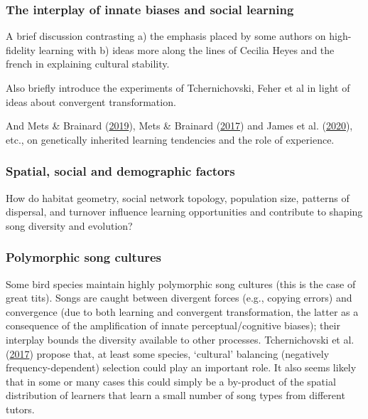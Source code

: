 \documentclass[]{report}
\begin{document}
\hypertarget{the-interplay-of-innate-biases-and-social-learning}{%
\subsubsection{The interplay of innate biases and social
learning}\label{the-interplay-of-innate-biases-and-social-learning}}

A brief discussion contrasting a) the emphasis placed by some authors on
high-fidelity learning with b) ideas more along the lines of Cecilia
Heyes and the french in explaining cultural stability.

Also briefly introduce the experiments of Tchernichovski, Feher et al in
light of ideas about convergent transformation.

And Mets \& Brainard (\protect\hyperlink{ref-Mets2019}{2019}), Mets \&
Brainard (\protect\hyperlink{ref-Mets2017}{2017}) and James et al.
(\protect\hyperlink{ref-James2020}{2020}), etc., on genetically
inherited learning tendencies and the role of experience.

\hypertarget{spatial-social-and-demographic-factors}{%
\subsubsection{Spatial, social and demographic
factors}\label{spatial-social-and-demographic-factors}}

How do habitat geometry, social network topology, population size,
patterns of dispersal, and turnover influence learning opportunities and
contribute to shaping song diversity and evolution?

\hypertarget{polymorphic-song-cultures}{%
\subsubsection{Polymorphic song
cultures}\label{polymorphic-song-cultures}}

Some bird species maintain highly polymorphic song cultures (this is the
case of great tits). Songs are caught between divergent forces (e.g.,
copying errors) and convergence (due to both learning and convergent
transformation, the latter as a consequence of the amplification of
innate perceptual/cognitive biases); their interplay bounds the
diversity available to other processes. Tchernichovski et al.
(\protect\hyperlink{ref-Tchernichovski2017a}{2017}) propose that, at
least some species, `cultural' balancing (negatively
frequency-dependent) selection could play an important role. It also
seems likely that in some or many cases this could simply be a
by-product of the spatial distribution of learners that learn a small
number of song types from different tutors.
\end{document}
